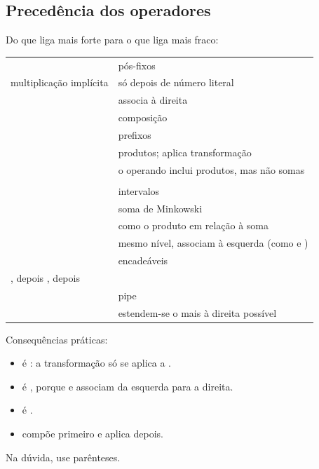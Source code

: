 \subsection{Precedência dos operadores}\label{sec:precedencia}
Do que liga mais forte para o que liga mais fraco:
\begin{longtable}{@{}L{0.45}L{0.55}@{}}
\toprule
{} &  \\
\midrule
{}\quad{}\quad{}\quad{}\quad{}\quad{} & pós-fixos \\
multiplicação implícita  & só depois de número literal \\
\code{^} & associa à direita \\
 & composição \\
\quad{} & prefixos \\
\quad{}\quad\code{/}\quad{} & produtos;  aplica transformação \\
\quad{}\quad{}\quad{} & o operando inclui produtos, mas não somas \\
\code{+}\quad\code{-}\quad\code{++} & \\
\quad{} & intervalos \\
 & soma de Minkowski \\
 & como o produto em relação à soma \\
\quad{}\quad{} & mesmo nível, associam à esquerda (como \code{+} e \code{-}) \\
\code{=}\quad{}\quad\code{<}\quad{}\quad\code{>}\quad{}\quad{}\quad{} & encadeáveis \\
, depois , depois  & \\
\code{|>} & pipe \\
\quad{}\quad{} & estendem-se o mais à direita possível \\
\bottomrule
\end{longtable}
Consequências práticas:
\begin{itemize}
  \item {} é : a transformação só se aplica a .
  \item {} é , porque  e  associam da esquerda para a direita.
  \item {} é .
  \item {} compõe primeiro e aplica depois.
\end{itemize}
Na dúvida, use parênteses.

